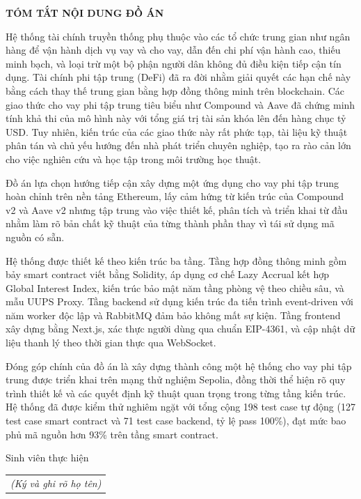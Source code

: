 \documentclass[../DoAn.tex]{subfiles}
\begin{document}
\begin{center}
    \Large{\textbf{TÓM TẮT NỘI DUNG ĐỒ ÁN}}\\
\end{center}
\vspace{1cm}
Hệ thống tài chính truyền thống phụ thuộc vào các tổ chức trung gian như ngân hàng để vận hành dịch vụ vay và cho vay, dẫn đến chi phí vận hành cao, thiếu minh bạch, và loại trừ một bộ phận người dân không đủ điều kiện tiếp cận tín dụng. Tài chính phi tập trung (DeFi) đã ra đời nhằm giải quyết các hạn chế này bằng cách thay thế trung gian bằng hợp đồng thông minh trên blockchain. Các giao thức cho vay phi tập trung tiêu biểu như Compound và Aave đã chứng minh tính khả thi của mô hình này với tổng giá trị tài sản khóa lên đến hàng chục tỷ USD. Tuy nhiên, kiến trúc của các giao thức này rất phức tạp, tài liệu kỹ thuật phân tán và chủ yếu hướng đến nhà phát triển chuyên nghiệp, tạo ra rào cản lớn cho việc nghiên cứu và học tập trong môi trường học thuật.

Đồ án lựa chọn hướng tiếp cận xây dựng một ứng dụng cho vay phi tập trung hoàn chỉnh trên nền tảng Ethereum, lấy cảm hứng từ kiến trúc của Compound v2 và Aave v2 nhưng tập trung vào việc thiết kế, phân tích và triển khai từ đầu nhằm làm rõ bản chất kỹ thuật của từng thành phần thay vì tái sử dụng mã nguồn có sẵn.

Hệ thống được thiết kế theo kiến trúc ba tầng. Tầng hợp đồng thông minh gồm bảy smart contract viết bằng Solidity, áp dụng cơ chế Lazy Accrual kết hợp Global Interest Index, kiến trúc bảo mật năm tầng phòng vệ theo chiều sâu, và mẫu UUPS Proxy. Tầng backend sử dụng kiến trúc đa tiến trình event-driven với năm worker độc lập và RabbitMQ đảm bảo không mất sự kiện. Tầng frontend xây dựng bằng Next.js, xác thực người dùng qua chuẩn EIP-4361, và cập nhật dữ liệu thanh lý theo thời gian thực qua WebSocket.

Đóng góp chính của đồ án là xây dựng thành công một hệ thống cho vay phi tập trung được triển khai trên mạng thử nghiệm Sepolia, đồng thời thể hiện rõ quy trình thiết kế và các quyết định kỹ thuật quan trọng trong từng tầng kiến trúc. Hệ thống đã được kiểm thử nghiêm ngặt với tổng cộng 198 test case tự động (127 test case smart contract và 71 test case backend, tỷ lệ pass 100\%), đạt mức bao phủ mã nguồn hơn 93\% trên tầng smart contract.

\begin{flushright}
Sinh viên thực hiện\\
\begin{tabular}{@{}c@{}}
\textit{(Ký và ghi rõ họ tên)}\\[1cm]
\end{tabular}
\end{flushright}
\end{document}
